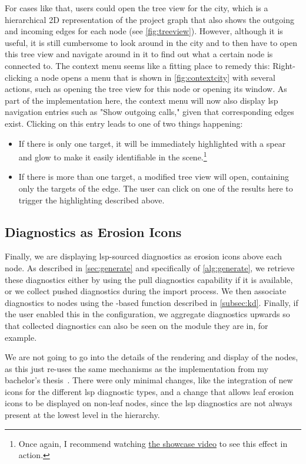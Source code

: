 \documentclass[../thesis]{subfiles}
\begin{document}
For cases like that, users could open the tree view for the city, which is a hierarchical 2D representation of the project graph that also shows the outgoing and incoming edges for each node (see \cref{fig:treeview}).
However, although it is useful, it is still cumbersome to look around in the city and to then have to open this tree view and navigate around in it to find out what a certain node is connected to.
The context menu seems like a fitting place to remedy this:
Right-clicking a node opens a menu that is shown in \cref{fig:contextcity} with several actions, such as opening the tree view for this node or opening its \gls{window}.
As part of the implementation here, the context menu will now also display \gls{lsp} navigation entries such as "Show outgoing calls," given that corresponding edges exist.
Clicking on this entry leads to one of two things happening:
\begin{itemize}
	\item If there is only one target, it will be immediately highlighted with a spear and glow to make it easily identifiable in the scene.\footnote{
		      Once again, I recommend watching \href{https://www.youtube.com/watch?v=yAzyv2_q2ng}{the showcase video} to see this effect in action.
	      }
	\item If there is more than one target, a modified tree view will open, containing only the targets of the edge.
	      The user can click on one of the results here to trigger the highlighting described above.
\end{itemize}

\subsection{Diagnostics as Erosion Icons}
Finally, we are displaying \gls{lsp}-sourced diagnostics as erosion icons above each node.
As described in \cref{sec:generate} and specifically  of \cref{alg:generate}, we retrieve these diagnostics either by using the pull diagnostics \gls{capability} if it is available, or we collect pushed diagnostics during the import process.
We then associate diagnostics to nodes using the -based function described in \cref{subsec:kd}.
Finally, if the user enabled this in the configuration, we aggregate diagnostics upwards so that collected diagnostics can also be seen on the module they are in, for example.

We are not going to go into the details of the rendering and display of the nodes, as this just re-uses the same mechanisms as the implementation from my bachelor's thesis~\cite[section~3.3]{galperin2021}.
There were only minimal changes, like the integration of new icons for the different \gls{lsp} diagnostic types, and a change that allows leaf erosion icons to be displayed on non-leaf nodes, since the \gls{lsp} diagnostics are not always present at the lowest level in the hierarchy.
\end{document}
